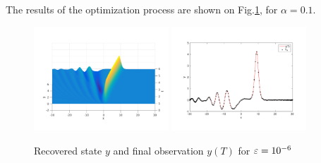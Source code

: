 The results  of the optimization process are shown on Fig.\ref{recoveredstate}, for $\alpha = 0.1$.
\begin{figure}[!h]
 \includegraphics[width = 0.45\textwidth]{images/ex1recoveredstate3d.pdf}
  \includegraphics[width = 0.45\textwidth]{images/ex1recoveredstate.pdf}
 \caption{Recovered state $y$ and final observation $y(T)$ for $\varepsilon = 10^{-6}$}
 \label{recoveredstate}
\end{figure}

